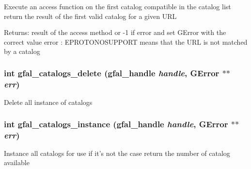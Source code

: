 Execute an access function on the first catalog compatible in the catalog list return the result of the first valid catalog for a given URL \begin{Desc}
\item[Returns:]result of the access method or -1 if error and set GError with the correct value error : EPROTONOSUPPORT means that the URL is not matched by a catalog \end{Desc}
\subsubsection{\setlength{\rightskip}{0pt plus 5cm}int gfal\_\-catalogs\_\-delete (gfal\_\-handle {\em handle}, GError $\ast$$\ast$ {\em err})}\label{gfal__common__catalog_8c_c0412247b6ddd6ceac7fb171c56adaad}


Delete all instance of catalogs 
\subsubsection{\setlength{\rightskip}{0pt plus 5cm}int gfal\_\-catalogs\_\-instance (gfal\_\-handle {\em handle}, GError $\ast$$\ast$ {\em err})}\label{gfal__common__catalog_8c_96ebd098ad2447a81f096207879b9d3a}


Instance all catalogs for use if it's not the case return the number of catalog available 